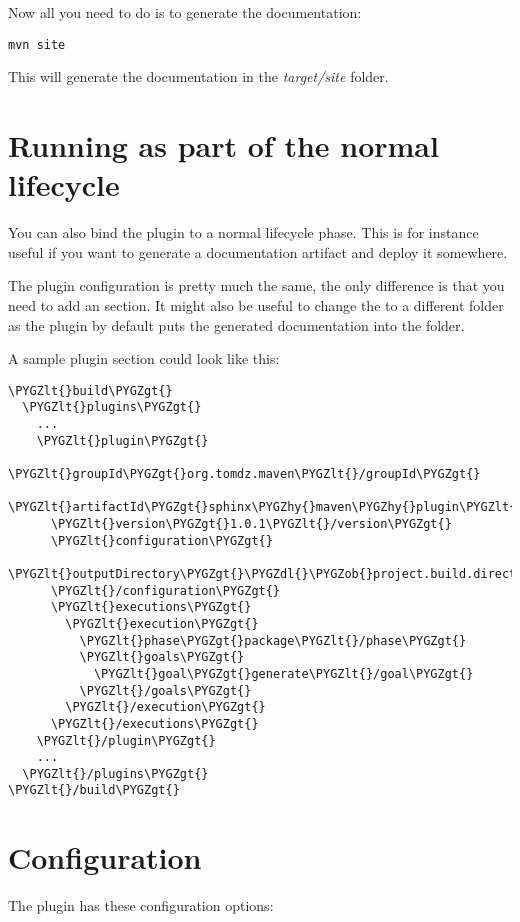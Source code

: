 \documentclass[letterpaper,10pt,english]{sphinxmanual}
\def\PYGZob{\char`\{}
\def\PYGZcb{\char`\}}
\def\PYGZlt{\char`\<}
\def\PYGZgt{\char`\>}
\def\PYGZdl{\char`\$}
\def\PYGZhy{\char`\-}
\begin{document}
Now all you need to do is to generate the documentation:

\begin{Verbatim}[commandchars=\\\{\}]
mvn site
\end{Verbatim}

This will generate the documentation in the \emph{target/site} folder.


\chapter{Running as part of the normal lifecycle}
\label{basic-usage:running-as-part-of-the-normal-lifecycle}
You can also bind the plugin to a normal lifecycle phase. This is for instance useful if you want to generate a
documentation artifact and deploy it somewhere.

The plugin configuration is pretty much the same, the only difference is that you need to add an  section.
It might also be useful to change the  to a different folder as the plugin by default puts the
generated documentation into the  folder.

A sample  plugin section could look like this:

\begin{Verbatim}[commandchars=\\\{\}]
\PYGZlt{}build\PYGZgt{}
  \PYGZlt{}plugins\PYGZgt{}
    ...
    \PYGZlt{}plugin\PYGZgt{}
      \PYGZlt{}groupId\PYGZgt{}org.tomdz.maven\PYGZlt{}/groupId\PYGZgt{}
      \PYGZlt{}artifactId\PYGZgt{}sphinx\PYGZhy{}maven\PYGZhy{}plugin\PYGZlt{}/artifactId\PYGZgt{}
      \PYGZlt{}version\PYGZgt{}1.0.1\PYGZlt{}/version\PYGZgt{}
      \PYGZlt{}configuration\PYGZgt{}
        \PYGZlt{}outputDirectory\PYGZgt{}\PYGZdl{}\PYGZob{}project.build.directory\PYGZcb{}/docs\PYGZlt{}/outputDirectory\PYGZgt{}
      \PYGZlt{}/configuration\PYGZgt{}
      \PYGZlt{}executions\PYGZgt{}
        \PYGZlt{}execution\PYGZgt{}
          \PYGZlt{}phase\PYGZgt{}package\PYGZlt{}/phase\PYGZgt{}
          \PYGZlt{}goals\PYGZgt{}
            \PYGZlt{}goal\PYGZgt{}generate\PYGZlt{}/goal\PYGZgt{}
          \PYGZlt{}/goals\PYGZgt{}
        \PYGZlt{}/execution\PYGZgt{}
      \PYGZlt{}/executions\PYGZgt{}
    \PYGZlt{}/plugin\PYGZgt{}
    ...
  \PYGZlt{}/plugins\PYGZgt{}
\PYGZlt{}/build\PYGZgt{}
\end{Verbatim}


\chapter{Configuration}
\label{configuration:rst2pdf-manual}\label{configuration:configuration}\label{configuration::doc}
The  plugin has these configuration options:
\end{document}
